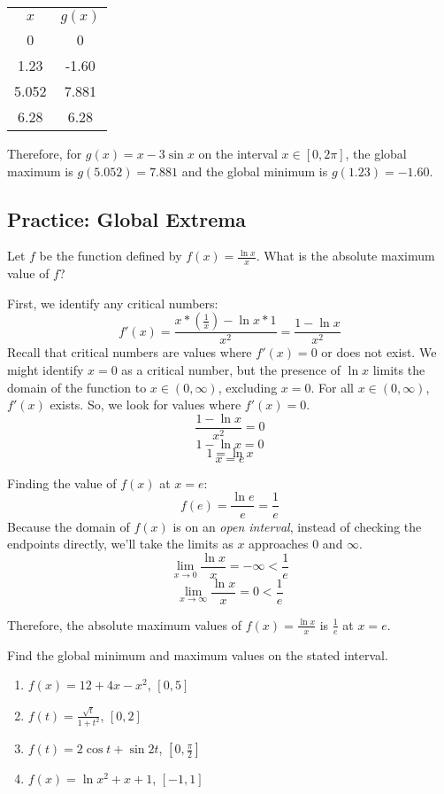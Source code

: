 \begin{tabular}{c | c}
$x$ & $g(x)$\\
0 & 0\\
1.23 & -1.60\\
5.052 & 7.881\\
6.28 & 6.28\\
\end{tabular}

Therefore, for $g(x) = x-3\sin{x}$ on the interval $x \in [0, 2\pi]$, the global maximum is $g(5.052) = 7.881$ and the global minimum is $g(1.23) = -1.60$. 

\subsection{Practice: Global Extrema}
\begin{Exercise}[label=gloext1]
Let $f$ be the function defined by $f(x) = \frac{\ln{x}}{x}$. What is the absolute maximum value of $f$?
\end{Exercise}

\begin{Answer}[ref=gloext1]
First, we identify any critical numbers:
$$f'(x) = \frac{x*(\frac{1}{x})-\ln{x}*1}{x^2} = \frac{1-\ln{x}}{x^2}$$
Recall that critical numbers are values where $f'(x)=0$ or does not exist. We might identify $x=0$ as a critical number, but the presence of $\ln{x}$ limits the domain of the function to $x \in (0, \infty)$, excluding $x=0$. For all $x \in (0, \infty)$, $f'(x)$ exists. So, we look for values where $f'(x) = 0$.
$$\frac{1-\ln{x}}{x^2}=0$$
$$1-\ln{x}=0$$
$$1=\ln{x}$$
$$x=e$$

Finding the value of $f(x)$ at $x=e$: 
$$f(e) = \frac{\ln{e}}{e}=\frac{1}{e}$$
Because the domain of $f(x)$ is on an \textit{open interval}, instead of checking the endpoints directly, we'll take the limits as $x$ approaches $0$ and $\infty$.
$$\lim_{x\to 0}\frac{\ln{x}}{x}=-\infty<\frac{1}{e}$$
$$\lim_{x \to \infty}\frac{\ln{x}}{x}=0<\frac{1}{e}$$

Therefore, the absolute maximum values of $f(x) = \frac{\ln{x}}{x}$ is $\frac{1}{e}$ at $x=e$. 
\end{Answer}

\begin{Exercise}[label=gloext2]
Find the global minimum and maximum values on the stated interval.
\begin{enumerate}
	\item $f(x) = 12+4x-x^2$, $[0,5]$
	\item $f(t) = \frac{\sqrt{t}}{1+t^2}$, $[0, 2]$
	\item $f(t) = 2\cos{t} + \sin{2t}$, $[0, \frac{\pi}{2}]$
	\item $f(x) = \ln{x^2+x+1}$, $[-1, 1]$
\end{enumerate}
\end{Exercise}

